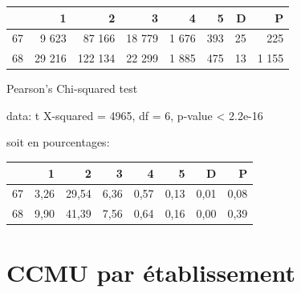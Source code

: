 \documentclass[12pt,english,french,twoside]{book}\usepackage[]{graphicx}\usepackage[]{color}
\begin{document}
\begin{table}[ht]
\centering
\begin{tabular}{rrrrrrrr}
  \hline
 & 1 & 2 & 3 & 4 & 5 & D & P \\ 
  \hline
67 & 9 623 & 87 166 & 18 779 & 1 676 & 393 &  25 & 225 \\ 
  68 & 29 216 & 122 134 & 22 299 & 1 885 & 475 &  13 & 1 155 \\ 
   \hline
\end{tabular}
\end{table}

	Pearson's Chi-squared test

data:  t
X-squared = 4965, df = 6, p-value < 2.2e-16



soit en pourcentages:

\begin{table}[ht]
\centering
\begin{tabular}{rrrrrrrr}
  \hline
 & 1 & 2 & 3 & 4 & 5 & D & P \\ 
  \hline
67 & 3,26 & 29,54 & 6,36 & 0,57 & 0,13 & 0,01 & 0,08 \\ 
  68 & 9,90 & 41,39 & 7,56 & 0,64 & 0,16 & 0,00 & 0,39 \\ 
   \hline
\end{tabular}
\end{table}


\section{CCMU par établissement}
\end{document}
